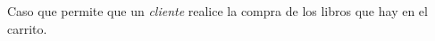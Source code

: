 %
%

{
  Caso que permite que un \textit{cliente} realice la compra de los libros que
  hay en el carrito. 
}
